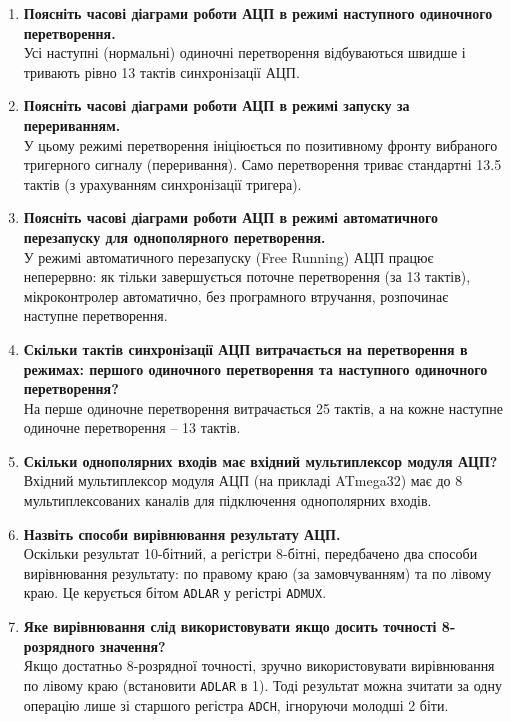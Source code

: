 \documentclass[14pt, a4paper]{extreport}
\begin{document}
\begin{enumerate}
		\item \textbf{Поясніть часові діаграми роботи АЦП в режимі наступного одиночного перетворення.} \\ Усі наступні (нормальні) одиночні перетворення відбуваються швидше і тривають рівно 13 тактів синхронізації АЦП.
		
		\item \textbf{Поясніть часові діаграми роботи АЦП в режимі запуску за перериванням.} \\ У цьому режимі перетворення ініціюється по позитивному фронту вибраного тригерного сигналу (переривання). Само перетворення триває стандартні 13.5 тактів (з урахуванням синхронізації тригера).
		
		\item \textbf{Поясніть часові діаграми роботи АЦП в режимі автоматичного перезапуску для однополярного перетворення.} \\ У режимі автоматичного перезапуску (Free Running) АЦП працює неперервно: як тільки завершується поточне перетворення (за 13 тактів), мікроконтролер автоматично, без програмного втручання, розпочинає наступне перетворення.
		
		\item \textbf{Скільки тактів синхронізації АЦП витрачається на перетворення в режимах: першого одиночного перетворення та наступного одиночного перетворення?} \\ На перше одиночне перетворення витрачається 25 тактів, а на кожне наступне одиночне перетворення -- 13 тактів.
		
		\item \textbf{Скільки однополярних входів має вхідний мультиплексор модуля АЦП?} \\ Вхідний мультиплексор модуля АЦП (на прикладі ATmega32) має до 8 мультиплексованих каналів для підключення однополярних входів.
		
		\item \textbf{Назвіть способи вирівнювання результату АЦП.} \\ Оскільки результат 10-бітний, а регістри 8-бітні, передбачено два способи вирівнювання результату: по правому краю (за замовчуванням) та по лівому краю. Це керується бітом \texttt{ADLAR} у регістрі \texttt{ADMUX}.
		
		\item \textbf{Яке вирівнювання слід використовувати якщо досить точності 8-розрядного значення?} \\ Якщо достатньо 8-розрядної точності, зручно використовувати вирівнювання по лівому краю (встановити \texttt{ADLAR} в 1). Тоді результат можна зчитати за одну операцію лише зі старшого регістра \texttt{ADCH}, ігноруючи молодші 2 біти.
		

\end{enumerate}
\end{document}
